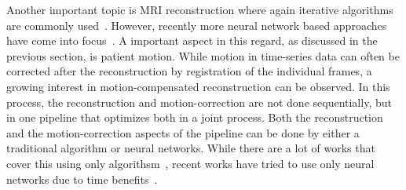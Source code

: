 Another important topic is MRI reconstruction where again iterative algorithms are commonly used~\cite{AdvancesPI,CS-MRI,ParallelMRI,GRAPPA}. However, recently more neural network based approaches have come into focus~\cite{DeepMRIReconstructionRadialSubsampling, DeepMRIReconstructionSubsampling}. A important aspect in this regard, as discussed in the previous section, is patient motion. While motion in time-series data can often be corrected after the reconstruction by registration of the individual frames, a growing interest in motion-compensated reconstruction can be observed. In this process, the reconstruction and motion-correction are not done sequentially, but in one pipeline that optimizes both in a joint process. Both the reconstruction and the motion-correction aspects of the pipeline can be done by either a traditional algorithm or neural networks. While there are a lot of works that cover this using only algorithsm~\cite{GRICS}, recent works have tried to use only neural networks due to time benefits~\cite{Pan2024,Zou2024}.



